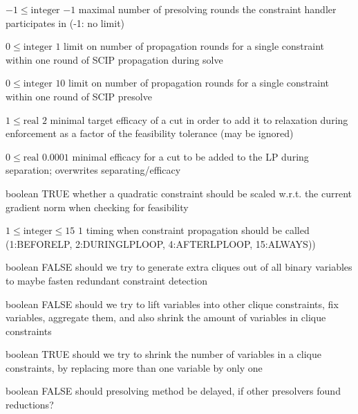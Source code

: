 %
{$-1\leq\textrm{integer}$}%
{$-1$}%
{maximal number of presolving rounds the constraint handler participates in (-1: no limit)}%
{}

%
{$0\leq\textrm{integer}$}%
{$1$}%
{limit on number of propagation rounds for a single constraint within one round of SCIP propagation during solve}%
{}

%
{$0\leq\textrm{integer}$}%
{$10$}%
{limit on number of propagation rounds for a single constraint within one round of SCIP presolve}%
{}

%
{$1\leq\textrm{real}$}%
{$2$}%
{minimal target efficacy of a cut in order to add it to relaxation during enforcement as a factor of the feasibility tolerance (may be ignored)}%
{}

%
{$0\leq\textrm{real}$}%
{$0.0001$}%
{minimal efficacy for a cut to be added to the LP during separation; overwrites separating/efficacy}%
{}

%
{boolean}%
{TRUE}%
{whether a quadratic constraint should be scaled w.r.t. the current gradient norm when checking for feasibility}%
{}

%
{$1\leq\textrm{integer}\leq15$}%
{$1$}%
{timing when constraint propagation should be called (1:BEFORELP, 2:DURINGLPLOOP, 4:AFTERLPLOOP, 15:ALWAYS))}%
{}

%
{boolean}%
{FALSE}%
{should we try to generate extra cliques out of all binary variables to maybe fasten redundant constraint detection}%
{}

%
{boolean}%
{FALSE}%
{ should we try to lift variables into other clique constraints, fix variables, aggregate them, and also shrink the amount of variables in clique constraints}%
{}

%
{boolean}%
{TRUE}%
{should we try to shrink the number of variables in a clique constraints, by replacing more than one variable by only one}%
{}

%
{boolean}%
{FALSE}%
{should presolving method be delayed, if other presolvers found reductions?}%
{}


